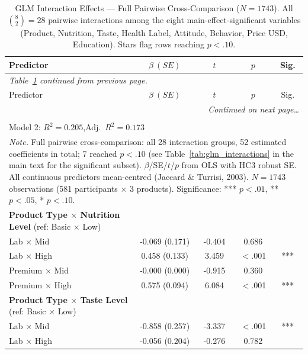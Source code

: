 \begin{center}
\begin{longtable}{lcccc}
\caption{GLM Interaction Effects --- Full Pairwise Cross-Comparison ($N=1743$). All $\binom{8}{2} = 28$ pairwise interactions among the eight main-effect-significant variables (Product, Nutrition, Taste, Health Label, Attitude, Behavior, Price USD, Education). Stars flag rows reaching $p<.10$.}\label{tab:glm_interactions_full} \\
\toprule
Predictor & $\beta\ (SE)$ & $t$ & $p$ & Sig. \\
\midrule
\endfirsthead
\multicolumn{5}{l}{\textit{Table~\ref{tab:glm_interactions_full} continued from previous page.}} \\
\toprule
Predictor & $\beta\ (SE)$ & $t$ & $p$ & Sig. \\
\midrule
\endhead
\midrule
\multicolumn{5}{r}{\textit{Continued on next page\ldots}} \\
\endfoot
\multicolumn{5}{l}{$\Delta R^2 = 0.059$,\quad $F$\text{-change}$(37,\ 1674) = 3.37$,\quad $p < .001$} \\
\multicolumn{5}{l}{Model 2: $R^2 = 0.205$,\quad Adj.\ $R^2 = 0.173$} \\
\bottomrule
\multicolumn{5}{p{0.95\linewidth}}{\footnotesize \textit{Note.} Full pairwise cross-comparison: all 28 interaction groups, 52 estimated coefficients in total; 7 reached $p<.10$ (see Table~\ref{tab:glm_interactions} in the main text for the significant subset). $\beta$/SE/$t$/$p$ from OLS with HC3 robust SE. All continuous predictors mean-centred (Jaccard \& Turrisi, 2003). $N=1743$ observations (581 participants $\times$ 3 products). Significance: *** $p<.01$, ** $p<.05$, * $p<.10$.}} \\
\endlastfoot
\quad \textbf{Product Type $\times$ Nutrition Level} (ref: Basic $\times$ Low) & & & & \\
\qquad Lab $\times$ Mid & -0.069 (0.171) & -0.404 & 0.686 &  \\
\qquad Lab $\times$ High & 0.458 (0.133) & 3.459 & $<$.001 & *** \\
\qquad Premium $\times$ Mid & -0.000 (0.000) & -0.915 & 0.360 &  \\
\qquad Premium $\times$ High & 0.575 (0.094) & 6.084 & $<$.001 & *** \\
\quad \textbf{Product Type $\times$ Taste Level} (ref: Basic $\times$ Low) & & & & \\
\qquad Lab $\times$ Mid & -0.858 (0.257) & -3.337 & $<$.001 & *** \\
\qquad Lab $\times$ High & -0.056 (0.204) & -0.276 & 0.782 &  \\

\end{longtable}
\end{center}
